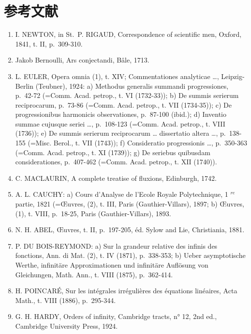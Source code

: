 \section*{参考文献}
{}

\begin{enumerate}
\def\labelenumi{(\Roman{enumi})}
\item
  I. NEWTON, in St.~P. RIGAUD, Correspondence of scientific men, Oxford, 1841, t. II, p.~309-310.
\item
  Jakob Bernoulli, Ars conjectandi, Bâle, 1713.
\item
  L. EULER, Opera omnia (1), t. XIV; Commentationes analyticae \ldots, Leipzig-Berlin (Teubner), 1924: a) Methodus generalis summandi progressiones, p.~42-72 (=Comm. Acad. petrop., t. VI (1732-33)); b) De summis serierum reciprocarum, p.~73-86 (=Comm. Acad. petrop., t. VII (1734-35)); c) De progressionibus harmonicis observationes, p.~87-100 (ibid.); d) Inventio summae cujusque seriei \ldots, p.~108-123 (=Comm. Acad. petrop., t. VIII (1736)); e) De summis serierum reciprocarum \ldots{} dissertatio altera \ldots, p.~138-155 (=Misc. Berol., t. VII (1743)); f) Consideratio progressionis \ldots, p.~350-363 (=Comm. Acad. petrop., t. XI (1739)); g) De seriebus quibusdam considerationes, p.~407-462 (=Comm. Acad. petrop., t. XII (1740)).
\item
  C. MACLAURIN, A complete treatise of fluxions, Edinburgh, 1742.
\item
  A. L. CAUCHY: a) Cours d'Analyse de l'Ecole Royale Polytechnique, 1 \(^{re}\) partie, 1821 (=Œuvres, (2), t. III, Paris (Gauthier-Villars), 1897; b) Œuvres, (1), t. VIII, p.~18-25, Paris (Gauthier-Villars), 1893.
\item
  N. H. ABEL, Œuvres, t. II, p.~197-205, éd. Sylow and Lie, Christiania, 1881.
\item
  P. DU BOIS-REYMOND: a) Sur la grandeur relative des infinis des fonctions, Ann. di Mat. (2), t. IV (1871), p.~338-353; b) Ueber asymptotische Werthe, infinitäre Approximationen und infinitäre Auflösung von Gleichungen, Math. Ann., t. VIII (1875), p.~362-414.
\item
  H. POINCARÉ, Sur les intégrales irrégulières des équations linéaires, Acta Math., t. VIII (1886), p.~295-344.
\item
  G. H. HARDY, Orders of infinity, Cambridge tracts, n° 12, 2nd ed., Cambridge University Press, 1924.
\end{enumerate}

